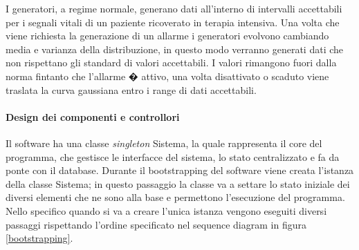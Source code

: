 \documentclass[final, smallexted]{svjour3}
\begin{document}
 I generatori, a regime normale, generano dati all'interno di intervalli accettabili per i segnali vitali di un paziente ricoverato in terapia intensiva. Una volta che viene richiesta la generazione di un allarme i generatori evolvono cambiando media e varianza della distribuzione, in questo modo verranno generati dati che non rispettano gli standard di valori accettabili. I valori rimangono fuori dalla norma fintanto che l'allarme � attivo, una volta disattivato o scaduto viene traslata la curva gaussiana entro i range di dati accettabili.
 
 \paragraph{\textbf{Design dei componenti e controllori}} Il software ha una classe \textit{singleton} Sistema, la quale rappresenta il core del programma, che gestisce le interfacce del sistema, lo stato centralizzato e fa da ponte con il database.
 Durante il bootstrapping del software viene creata l'istanza della classe Sistema; in questo passaggio la classe va a settare lo stato iniziale dei diversi elementi che ne sono alla base e permettono l'esecuzione del programma. Nello specifico quando si va a creare l'unica istanza vengono eseguiti diversi passaggi rispettando l'ordine specificato nel sequence diagram in figura \ref{bootstrapping}.
 
\end{document}

